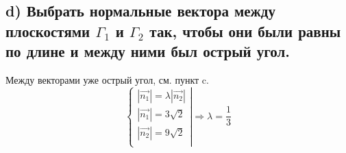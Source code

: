 \documentclass[12pt]{article}
\begin{document}
\begin{sloppypar}
    \subsection{d) Выбрать нормальные вектора между плоскостями $\Gamma_1$ и $\Gamma_2$ так, чтобы они были равны по длине и между ними был острый угол.}
    Между векторами уже острый угол, см. пункт c.
    \[
        \left\{\begin{array}{l}
            |\Vec{n_1}| = \lambda |\Vec{n_2}| \\
            |\Vec{n_1}| = 3\sqrt{2}           \\
            |\Vec{n_2}| = 9\sqrt{2}           \\
        \end{array}\right|
        \Rightarrow
        \lambda = \dfrac{1}{3}
    \]



\end{sloppypar}
\end{document}
